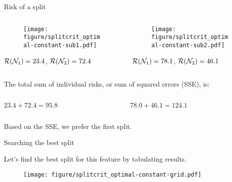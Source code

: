 \documentclass[11pt,compress,t,notes=noshow, xcolor=table]{beamer}
\begin{document}
\begin{vbframe}{Risk of a split}

\begin{columns}
\begin{column}{0.5\textwidth}


\begin{figure}
\texttt{[image: figure/splitcrit\_optimal-constant-sub1.pdf]} 
\end{figure}

$\mathcal{R}(\mathcal{N}_1) = 23.4$, $\mathcal{R}(\mathcal{N}_2) = 72.4$ 
 
\end{column}
\begin{column}{0.5\textwidth}

\begin{figure}
\texttt{[image: figure/splitcrit\_optimal-constant-sub2.pdf]} 
\end{figure}

$\mathcal{R}(\mathcal{N}_1) = 78.1$, $\mathcal{R}(\mathcal{N}_2) = 46.1$

\end{column}
\end{columns}
\vspace{0.1in}

The total sum of individual risks, or sum of squared errors (SSE), is:
\vspace{0.1in}

\begin{columns}
\begin{column}{0.5\textwidth}
$23.4 + 72.4 = 95.8$
\end{column}

\begin{column}{0.5\textwidth}
$78.0 + 46.1 = 124.1$ 
\end{column}
\end{columns}

\vspace{0.1in}
Based on the SSE, we prefer the first split.

\end{vbframe}

\begin{vbframe}{Searching the best split}

Let's find the best split for this feature by tabulating results.

\begin{figure}
\texttt{[image: figure/splitcrit\_optimal-constant-grid.pdf]} 
\end{figure}


\end{vbframe}
\end{document}
